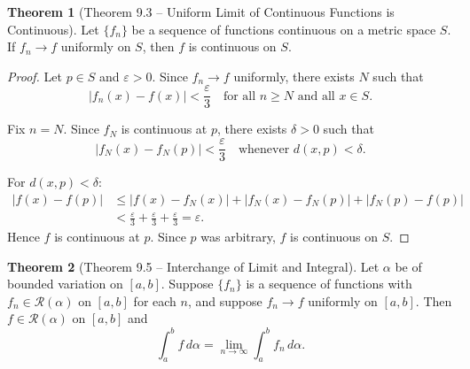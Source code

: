 \documentclass[12pt,a4paper]{article}
\theoremstyle{definition}
\newtheorem{theorem}{Theorem}[section]
\newcommand{\eps}{\varepsilon}
\begin{document}
\begin{theorem}[Theorem 9.3 -- Uniform Limit of Continuous Functions is Continuous]
Let $\{f_n\}$ be a sequence of functions continuous on a metric space $S$. If $f_n \to f$ uniformly on $S$, then $f$ is continuous on $S$.
\end{theorem}

\begin{proof}
Let $p \in S$ and $\eps > 0$. Since $f_n \to f$ uniformly, there exists $N$ such that
\[
    |f_n(x) - f(x)| < \frac{\eps}{3} \quad \text{for all } n \geq N \text{ and all } x \in S.
\]

Fix $n = N$. Since $f_N$ is continuous at $p$, there exists $\delta > 0$ such that
\[
    |f_N(x) - f_N(p)| < \frac{\eps}{3} \quad \text{whenever } d(x, p) < \delta.
\]

For $d(x, p) < \delta$:
\begin{align*}
    |f(x) - f(p)| &\leq |f(x) - f_N(x)| + |f_N(x) - f_N(p)| + |f_N(p) - f(p)| \\
    &< \frac{\eps}{3} + \frac{\eps}{3} + \frac{\eps}{3} = \eps.
\end{align*}
Hence $f$ is continuous at $p$. Since $p$ was arbitrary, $f$ is continuous on $S$.
\end{proof}

\begin{theorem}[Theorem 9.5 -- Interchange of Limit and Integral]
Let $\alpha$ be of bounded variation on $[a,b]$. Suppose $\{f_n\}$ is a sequence of functions with $f_n \in \mathcal{R}(\alpha)$ on $[a,b]$ for each $n$, and suppose $f_n \to f$ uniformly on $[a,b]$. Then $f \in \mathcal{R}(\alpha)$ on $[a,b]$ and
\[
    \int_a^b f\,d\alpha = \lim_{n \to \infty} \int_a^b f_n\,d\alpha.
\]
\end{theorem}
\end{document}
